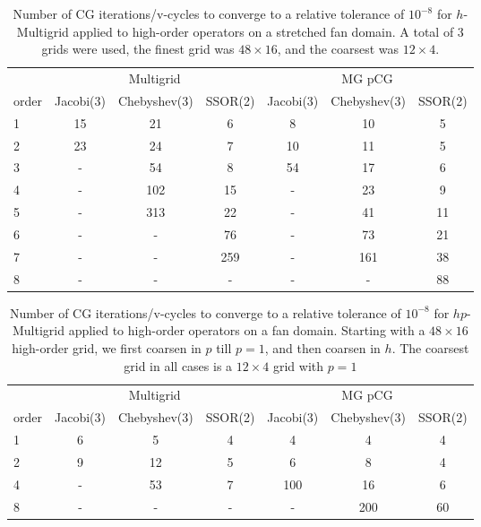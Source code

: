\begin{table}
  \caption{\label{tab:homg} Number of CG iterations/v-cycles to converge to a relative tolerance of $10^{-8}$ for $h$-Multigrid applied to high-order operators on a stretched fan domain. A total of 3 grids were used, the finest grid was $48\times 16$, and the coarsest was $12\times 4$.}
		\centering
    \begin{tabular}{|l|c|c|c|c|c|c|} 
	    \hline
				    & \multicolumn{3}{c|}{Multigrid} & \multicolumn{3}{c|}{MG pCG}\\  \cline{2-7}
			order & \scriptsize Jacobi(3)  &\scriptsize  Chebyshev(3)  &\scriptsize SSOR(2) &\scriptsize Jacobi(3)  &\scriptsize  Chebyshev(3)  &\scriptsize SSOR(2) \\
			\hline
      
      1 & 15 & 21 & 6 & 8 & 10 & 5 \\ 
			2 & 23 & 24 & 7 & 10 & 11 & 5 \\
      3 & -  & 54 & 8 & 54 & 17 & 6 \\
      4 & -  & 102 & 15 & - & 23 & 9 \\
      5 & -  & 313 & 22 & - & 41 & 11 \\
      6 & - & - & 76 & - & 73 & 21 \\ 
      7 & - & - & 259 & - & 161 & 38 \\
      8 & - & - & - & - & - & 88 \\
      \hline
	  \end{tabular}
\end{table}


\begin{table}
  \caption{\label{tab:hpmg} Number of CG iterations/v-cycles to converge to a relative tolerance of $10^{-8}$ for $hp$-Multigrid applied to high-order operators on a fan domain. Starting with a $48\times 16$ high-order grid, we first coarsen in $p$ till $p=1$, and then coarsen in $h$. The coarsest grid in all cases is a $12\times 4$ grid with $p=1$}
		\centering
		\begin{tabular}{|l|c|c|c|c|c|c|} 
	    \hline
				    & \multicolumn{3}{c|}{Multigrid} & \multicolumn{3}{c|}{MG pCG}\\  \cline{2-7}
			order & \scriptsize Jacobi(3)  &\scriptsize  Chebyshev(3)  &\scriptsize SSOR(2) &\scriptsize Jacobi(3)  &\scriptsize  Chebyshev(3)  &\scriptsize SSOR(2) \\
			\hline
				1 & 6  &  5 &  4 & 4 & 4 & 4 \\ 
        2 & 9 & 12 & 5 & 6 & 8 & 4 \\
				4 & - & 53 & 7 & 100 & 16 & 6 \\
        8 & - & -  & - & - & 200 & 60 \\
			\hline
	  \end{tabular}
\end{table}



